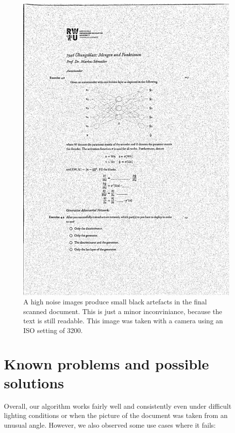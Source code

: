 \documentclass[bibliography=totoc]{scrartcl}
\begin{document}
	\begin{figure}[h!]
		\centering
		\includegraphics[width=0.3\linewidth]{imgs/threshold/noise.jpg}
		\caption{A high noise images produce small black artefacts in the final scanned document. This is just a minor inconviniance, because the text is still readable. This image was taken with a camera using an ISO setting of 3200.}
		\label{fig:noise}
	\end{figure}

	\section{Known problems and possible solutions}
	Overall, our algorithm works fairly well and consistently even under difficult lighting conditions or when the picture of the document was taken from an unusual angle.
	However, we also observed some use cases where it fails:
\end{document}
